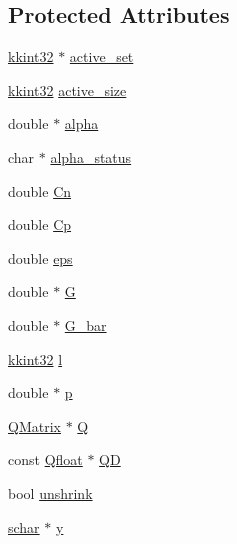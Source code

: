 \subsection*{Protected Attributes}
\begin{DoxyCompactItemize}
\item 
\hyperlink{namespace_k_k_b_a8fa4952cc84fda1de4bec1fbdd8d5b1b}{kkint32} $\ast$ \hyperlink{class_s_v_m289___m_f_s_1_1_solver_a7b9a480a3eaae0248a03ebf399dd3c75}{active\+\_\+set}
\item 
\hyperlink{namespace_k_k_b_a8fa4952cc84fda1de4bec1fbdd8d5b1b}{kkint32} \hyperlink{class_s_v_m289___m_f_s_1_1_solver_a8996bbbda51e87b157af0e8c4ad78411}{active\+\_\+size}
\item 
double $\ast$ \hyperlink{class_s_v_m289___m_f_s_1_1_solver_a5a6158adccc034c04bdacf91e6bbb237}{alpha}
\item 
char $\ast$ \hyperlink{class_s_v_m289___m_f_s_1_1_solver_a1f3505d06f19ce96eff19d3908adc42d}{alpha\+\_\+status}
\item 
double \hyperlink{class_s_v_m289___m_f_s_1_1_solver_a56f6a320000a868937411fa4cfd458b5}{Cn}
\item 
double \hyperlink{class_s_v_m289___m_f_s_1_1_solver_a951f59ea72f372f0e188c5815774fc6d}{Cp}
\item 
double \hyperlink{class_s_v_m289___m_f_s_1_1_solver_afc19fe2ebf0ad2239f9f1c6db2d85c12}{eps}
\item 
double $\ast$ \hyperlink{class_s_v_m289___m_f_s_1_1_solver_a96465496d62f5c9566275270d7a54a4f}{G}
\item 
double $\ast$ \hyperlink{class_s_v_m289___m_f_s_1_1_solver_a384cdc6a8882e17f0b78a817d570c5f7}{G\+\_\+bar}
\item 
\hyperlink{namespace_k_k_b_a8fa4952cc84fda1de4bec1fbdd8d5b1b}{kkint32} \hyperlink{class_s_v_m289___m_f_s_1_1_solver_a3b58f02675a93b7f559946c731beebd5}{l}
\item 
double $\ast$ \hyperlink{class_s_v_m289___m_f_s_1_1_solver_aee0ff21847e331b59d7a929b3c813b94}{p}
\item 
\hyperlink{class_s_v_m289___m_f_s_1_1_q_matrix}{Q\+Matrix} $\ast$ \hyperlink{class_s_v_m289___m_f_s_1_1_solver_a5655aaf1c92b609e8ed2087e08b053eb}{Q}
\item 
const \hyperlink{namespace_s_v_m289___m_f_s_a440663a1b8d42bc10329401883645ae1}{Qfloat} $\ast$ \hyperlink{class_s_v_m289___m_f_s_1_1_solver_a5bb379d32ebad294ad384244fee7e8a5}{QD}
\item 
bool \hyperlink{class_s_v_m289___m_f_s_1_1_solver_a78b071d4004e114f5b6b89839ca99b58}{unshrink}
\item 
\hyperlink{namespace_s_v_m289___m_f_s_a27545e8471784d831870feacd3e831ff}{schar} $\ast$ \hyperlink{class_s_v_m289___m_f_s_1_1_solver_ab9586d6d550d7806b9582b9279217ff5}{y}
\end{DoxyCompactItemize}


